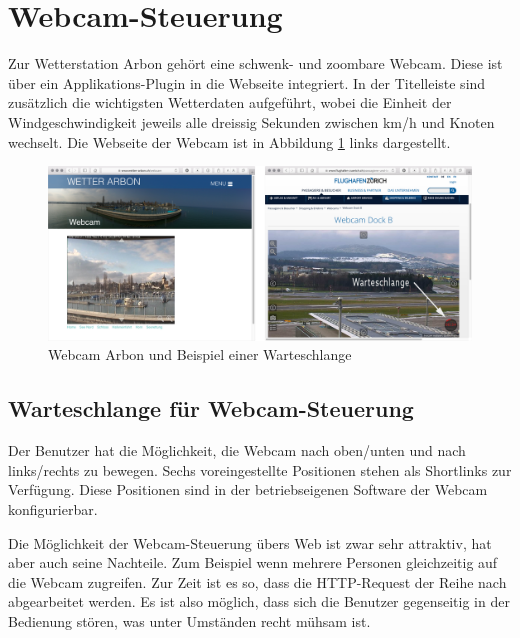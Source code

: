 \section{Webcam-Steuerung}
Zur Wetterstation Arbon gehört eine schwenk- und zoombare Webcam. Diese ist über ein Applikations-Plugin in die Webseite integriert. In der Titelleiste sind zusätzlich die wichtigsten Wetterdaten aufgeführt, wobei die Einheit der Windgeschwindigkeit jeweils alle dreissig Sekunden zwischen km/h und Knoten wechselt. Die Webseite der Webcam ist in Abbildung \ref{img:warteschlange} links dargestellt.

\begin{figure}[h]
	\centering
	\includegraphics[width=1\linewidth]{img/warteschlange}
	\caption{Webcam Arbon und Beispiel einer Warteschlange}
	\label{img:warteschlange}
\end{figure}


\subsection{Warteschlange für Webcam-Steuerung}
Der Benutzer hat die Möglichkeit, die Webcam nach oben/unten und nach links/rechts zu bewegen. Sechs voreingestellte Positionen stehen als Shortlinks zur Verfügung. Diese Positionen sind in der betriebseigenen Software der Webcam konfigurierbar.
\newline

\noindent
Die Möglichkeit der Webcam-Steuerung übers Web ist zwar sehr attraktiv, hat aber auch seine Nachteile. Zum Beispiel wenn mehrere Personen gleichzeitig auf die Webcam zugreifen. Zur Zeit ist es so, dass die HTTP-Request der Reihe nach abgearbeitet werden. Es ist also möglich, dass sich die Benutzer gegenseitig in der Bedienung stören, was unter Umständen recht mühsam ist. 
\newline

